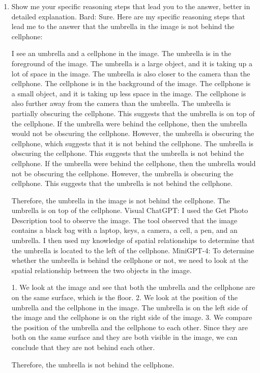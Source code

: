 \begin{enumerate}
    Therefore, the umbrella in the image is not behind the cellphone. The umbrella is on top of the cellphone.
    \subitem Visual ChatGPT: The umbrella is not behind the cellphone. It is located to the left of the cellphone.
    \subitem MiniGPT-4: No, the umbrella is not behind the cellphone. They are both on the same surface, which is the floor, and they are both visible in the image.
    \item Show me your specific reasoning steps that lead you to the answer, better in detailed explanation.
    \subitem Bard: Sure. Here are my specific reasoning steps that lead me to the answer that the umbrella in the image is not behind the cellphone:

    I see an umbrella and a cellphone in the image.
    The umbrella is in the foreground of the image. The umbrella is a large object, and it is taking up a lot of space in the image. The umbrella is also closer to the camera than the cellphone.
    The cellphone is in the background of the image. The cellphone is a small object, and it is taking up less space in the image. The cellphone is also further away from the camera than the umbrella.
    The umbrella is partially obscuring the cellphone. This suggests that the umbrella is on top of the cellphone.
    If the umbrella were behind the cellphone, then the umbrella would not be obscuring the cellphone. However, the umbrella is obscuring the cellphone, which suggests that it is not behind the cellphone.
    The umbrella is obscuring the cellphone. This suggests that the umbrella is not behind the cellphone. If the umbrella were behind the cellphone, then the umbrella would not be obscuring the cellphone. However, the umbrella is obscuring the cellphone. This suggests that the umbrella is not behind the cellphone.
    
    Therefore, the umbrella in the image is not behind the cellphone. The umbrella is on top of the cellphone.
    \subitem Visual ChatGPT: I used the Get Photo Description tool to observe the image. The tool observed that the image contains a black bag with a laptop, keys, a camera, a cell, a pen, and an umbrella. I then used my knowledge of spatial relationships to determine that the umbrella is located to the left of the cellphone.
    \subitem MiniGPT-4: To determine whether the umbrella is behind the cellphone or not, we need to look at the spatial relationship between the two objects in the image.

    1. We look at the image and see that both the umbrella and the cellphone are on the same surface, which is the floor.
    2. We look at the position of the umbrella and the cellphone in the image. The umbrella is on the left side of the image and the cellphone is on the right side of the image.
    3. We compare the position of the umbrella and the cellphone to each other. Since they are both on the same surface and they are both visible in the image, we can conclude that they are not behind each other.
    
    Therefore, the umbrella is not behind the cellphone.
\end{enumerate}
